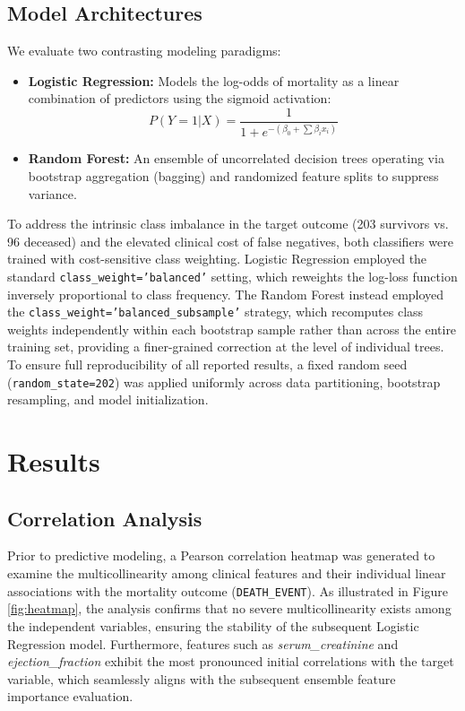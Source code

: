 \documentclass[11pt]{article} %
\begin{document}
\subsection{Model Architectures}
We evaluate two contrasting modeling paradigms:
\begin{itemize}
    \item \textbf{Logistic Regression:} Models the log-odds of mortality as a linear combination of predictors using the sigmoid activation:
    \begin{equation}
    P(Y=1|X) = \frac{1}{1 + e^{-(\beta_0 + \sum \beta_i x_i)}}
    \end{equation}
    \item \textbf{Random Forest:} An ensemble of uncorrelated decision trees operating via bootstrap aggregation (bagging) and randomized feature splits to suppress variance.
\end{itemize}

To address the intrinsic class imbalance in the target outcome (203 survivors vs. 96 deceased) and the elevated clinical cost of false negatives, both classifiers were trained with cost-sensitive class weighting. Logistic Regression employed the standard \texttt{class\_weight='balanced'} setting, which reweights the log-loss function inversely proportional to class frequency. The Random Forest instead employed the \texttt{class\_weight='balanced\_subsample'} strategy, which recomputes class weights independently within each bootstrap sample rather than across the entire training set, providing a finer-grained correction at the level of individual trees. To ensure full reproducibility of all reported results, a fixed random seed (\texttt{random\_state=202}) was applied uniformly across data partitioning, bootstrap resampling, and model initialization.


\section{Results}

\subsection{Correlation Analysis}
Prior to predictive modeling, a Pearson correlation heatmap was generated to examine the multicollinearity among clinical features and their individual linear associations with the mortality outcome (\texttt{DEATH\_EVENT}). As illustrated in Figure \ref{fig:heatmap}, the analysis confirms that no severe multicollinearity exists among the independent variables, ensuring the stability of the subsequent Logistic Regression model. Furthermore, features such as \textit{serum\_creatinine} and \textit{ejection\_fraction} exhibit the most pronounced initial correlations with the target variable, which seamlessly aligns with the subsequent ensemble feature importance evaluation.
\end{document}
